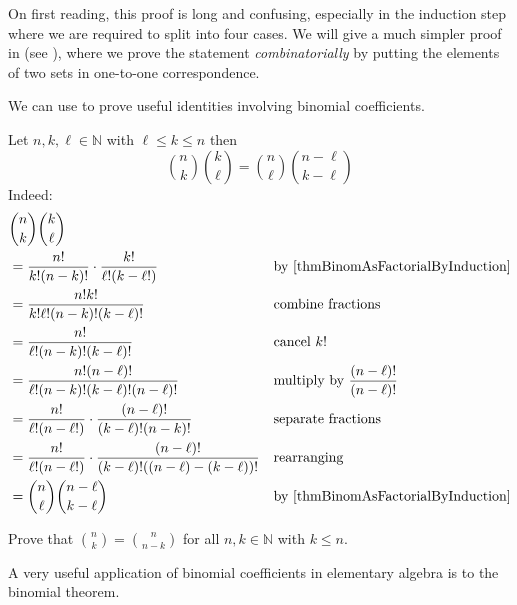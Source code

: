 On first reading, this proof is long and confusing, especially in the induction step where we are required to split into four cases. We will give a much simpler proof in  (see ), where we prove the statement \textit{combinatorially} by putting the elements of two sets in one-to-one correspondence.

We can use  to prove useful identities involving binomial coefficients.

\begin{example}
Let $n,k,\ell \in \mathbb{N}$ with $\ell \le k \le n$ then \[ \binom{n}{k}\binom{k}{\ell} = \binom{n}{\ell}\binom{n-\ell}{k-\ell} \]
Indeed:
\begin{align*}
& \binom{n}{k} \binom{k}{\ell} && \\
&= \frac{n!}{k!(n-k)!} \cdot \frac{k!}{\ell!(k-\ell!)} && \text{by \Cref{thmBinomAsFactorialByInduction}} \\
&= \frac{n!k!}{k!\ell!(n-k)!(k-\ell)!} && \text{combine fractions} \\
&= \frac{n!}{\ell!(n-k)!(k-\ell)!} && \text{cancel } k!\\
&= \frac{n!(n-\ell)!}{\ell!(n-k)!(k-\ell)!(n-\ell)!} && \text{multiply by } \frac{(n-\ell)!}{(n-\ell)!} \\
&= \frac{n!}{\ell!(n-\ell!)} \cdot \frac{(n-\ell)!}{(k-\ell)!(n-k)!} && \text{separate fractions} \\
&= \frac{n!}{\ell!(n-\ell!)} \cdot \frac{(n-\ell)!}{(k-\ell)!((n-\ell)-(k-\ell))!} && \text{rearranging} \\
&= \binom{n}{\ell} \binom{n-\ell}{k-\ell} && \text{by \Cref{thmBinomAsFactorialByInduction}}
\end{align*}
\end{example}

\begin{exercise}
Prove that $\binom{n}{k} = \binom{n}{n-k}$ for all $n,k \in \mathbb{N}$ with $k \le n$.
\end{exercise}

A very useful application of binomial coefficients in elementary algebra is to the binomial theorem.

